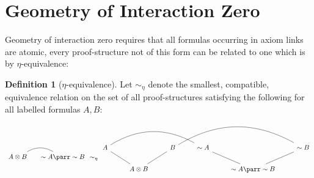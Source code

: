 \documentclass[12pt]{article}
\theoremstyle{plain}
\theoremstyle{definition}
\newtheorem{defn}[thm]{Definition} %
\newcommand{\negation}{\sim}
\begin{document}
\section{Geometry of Interaction Zero}
Geometry of interaction zero requires that all formulas occurring in axiom links are atomic, every proof-structure not of this form can be related to one which is by $\eta$-equivalence:
\begin{defn}[$\eta$-equivalence]
Let $\sim_{\eta}$ denote the smallest, compatible, equivalence relation on the set of all proof-structures satisfying the following for all labelled formulas $A,B$:
\begin{equation}
\begin{tikzcd}[column sep = small]
A\otimes B \arrow[r,dash, bend left] & \negation A \parr \negation B
\end{tikzcd}
\sim_{\eta}
\begin{tikzcd}
A\arrow[rrr,bend left, dash]\arrow[dr,dash] & & B\arrow[rrr,dash,bend left]\arrow[dl,dash] & \negation A\arrow[dr,dash] & & \negation B\arrow[dl,dash]\\
& A \otimes B & & & \negation A \parr \negation B
\end{tikzcd}
\end{equation}
\end{defn}
\end{document}
